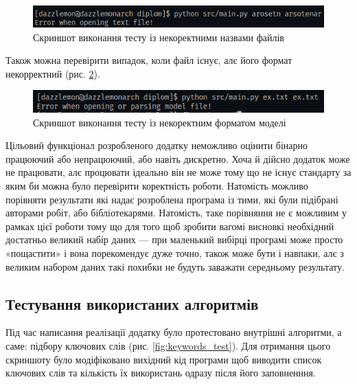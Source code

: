 \documentclass[14pt]{extarticle}
\begin{document}
  \begin{figure}[H]
    \centering
    \includegraphics[width=\linewidth]{file_not_found_test.png}    
    \captionsetup{justification=centering}  
    \caption{Скриншот виконання тесту із некоректними назвами файлів}
    \label{fig:file_not_found_test}
  \end{figure}

  Також можна перевірити випадок, коли файл існує, алє його формат некорректний
  (рис. \ref{fig:bad_model_test}).

  \begin{figure}[H]
    \centering
    \includegraphics[width=\linewidth]{bad_model_test.png}    
    \captionsetup{justification=centering}  
    \caption{Скриншот виконання тесту із некоректним форматом моделі}
    \label{fig:bad_model_test}
  \end{figure}

  Цільовий функціонал розробленого додатку неможливо оцінити бінарно працюючий
  або непрацюючий, або навіть дискретно. Хоча й дійсно додаток може не працювати,
  алє процювати ідеально він не може тому що не існує стандарту за яким
  би можна було перевірити коректність роботи. Натомість можливо порівняти
  результати які надає розроблена програма із тими, які були підібрані авторами
  робіт, або бібліотекарями. Натомість, таке порівняння не є можливим у
  рамках цієї роботи тому що для того щоб зробити вагомі висновкі необхідний
  достатньо великий набір даних --- при маленький вибірці програмі може просто
  «пощастити» і вона порекомендує дуже точно, також може бути і навпаки,
  алє з великим набором даних такі похибки не будуть заважати середньому
  результату.

  \subsection{Тестування використаних алгоритмів}

  Під час написання реалізації додатку було протестовано внутрішні алгоритми,
  а саме: підбору ключових слів (рис. \ref{fig:keywords_test}).
  Для отримання цього скриншоту було модіфіковано
  вихідний кід програми щоб виводити список ключових слів 
  та кількість їх використань одразу після його заповненння.
  
\end{document}
